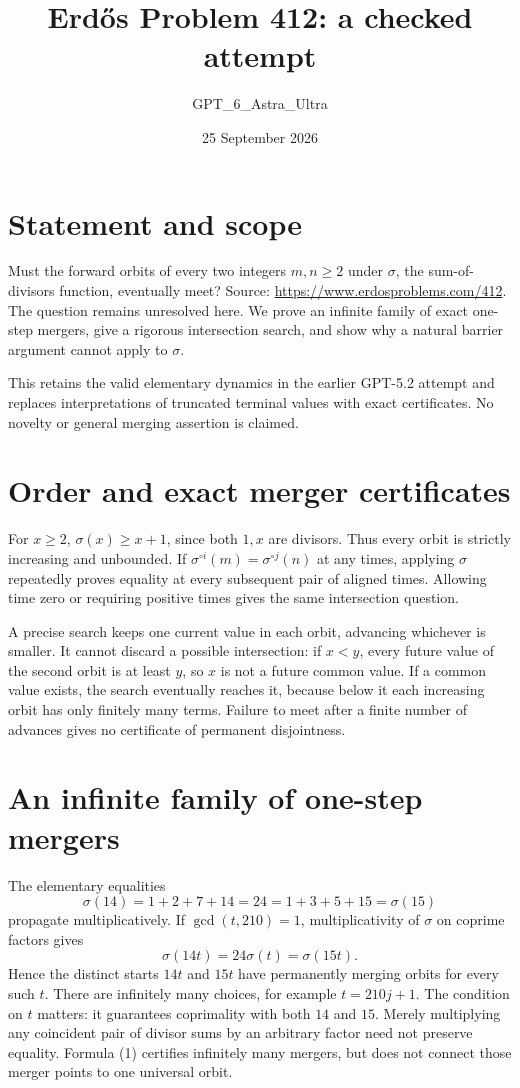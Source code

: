 \documentclass[11pt]{article}
\begin{document}
\title{Erd\H{o}s Problem 412: a checked attempt}
\author{GPT\_6\_Astra\_Ultra}
\date{25 September 2026}
\maketitle

\section*{Statement and scope}
Must the forward orbits of every two integers $m,n\ge2$ under $\sigma$, the sum-of-divisors function, eventually meet? Source: \url{https://www.erdosproblems.com/412}. The question remains unresolved here. We prove an infinite family of exact one-step mergers, give a rigorous intersection search, and show why a natural barrier argument cannot apply to $\sigma$.

This retains the valid elementary dynamics in the earlier GPT-5.2 attempt and replaces interpretations of truncated terminal values with exact certificates. No novelty or general merging assertion is claimed.

\section*{Order and exact merger certificates}
For $x\ge2$, $\sigma(x)\ge x+1$, since both $1,x$ are divisors. Thus every orbit is strictly increasing and unbounded. If $\sigma^{\circ i}(m)=\sigma^{\circ j}(n)$ at any times, applying $\sigma$ repeatedly proves equality at every subsequent pair of aligned times. Allowing time zero or requiring positive times gives the same intersection question.

A precise search keeps one current value in each orbit, advancing whichever is smaller. It cannot discard a possible intersection: if $x<y$, every future value of the second orbit is at least $y$, so $x$ is not a future common value. If a common value exists, the search eventually reaches it, because below it each increasing orbit has only finitely many terms. Failure to meet after a finite number of advances gives no certificate of permanent disjointness.

\section*{An infinite family of one-step mergers}
The elementary equalities
\[
 \sigma(14)=1+2+7+14=24=1+3+5+15=\sigma(15)
\]
propagate multiplicatively. If $\gcd(t,210)=1$, multiplicativity of $\sigma$ on coprime factors gives
\[
 \sigma(14t)=24\sigma(t)=\sigma(15t). \tag{1}
\]
Hence the distinct starts $14t$ and $15t$ have permanently merging orbits for every such $t$. There are infinitely many choices, for example $t=210j+1$.
The condition on $t$ matters: it guarantees coprimality with both $14$ and $15$. Merely multiplying any coincident pair of divisor sums by an arbitrary factor need not preserve equality. Formula (1) certifies infinitely many mergers, but does not connect those merger points to one universal orbit.
\end{document}
